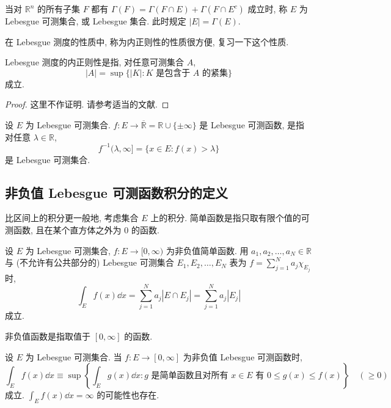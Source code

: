 \begin{definition}\label{def:2.4}
当对 $\mathbb{R}^{n}$ 的所有子集 $F$ 都有 $\Gamma(F) = \Gamma(F \cap E) + \Gamma(F \cap E^{c})$ 成立时, 称 $E$ 为 Lebesgue 可测集合, 或 Lebesgue 集合. 此时规定 $|E| = \Gamma(E)$.
\end{definition}

在 Lebesgue 测度的性质中, 称为内正则性的性质很方便, 复习一下这个性质.

\begin{theorem}\label{thm:2.1}
Lebesgue 测度的内正则性是指, 对任意可测集合 $A$,
\begin{equation}\tag{2.1}
|A| = \sup\{|K| : K \text{ 是包含于 } A \text{ 的紧集}\}
\label{eq:2.1}
\end{equation}
成立.
\end{theorem}

\begin{proof}
这里不作证明. 请参考适当的文献.
\end{proof}

\begin{definition}\label{def:2.5}
设 $E$ 为 Lebesgue 可测集合. $f: E \to \overline{\mathbb{R}} = \mathbb{R} \cup \{\pm\infty\}$ 是 Lebesgue 可测函数, 是指对任意 $\lambda \in \mathbb{R}$,
\[
f^{-1}(\lambda, \infty] = \{x \in E : f(x) > \lambda\}
\]
是 Lebesgue 可测集合.
\end{definition}

\subsection*{非负值 Lebesgue 可测函数积分的定义}

比区间上的积分更一般地, 考虑集合 $E$ 上的积分. 简单函数是指只取有限个值的可测函数, 且在某个直方体之外为 $0$ 的函数.

\begin{definition}[简单函数的积分]\label{def:2.6}
设 $E$ 为 Lebesgue 可测集合, $f: E \to [0, \infty)$ 为非负值简单函数. 用 $a_{1}, a_{2}, \ldots, a_{N} \in \mathbb{R}$ 与 (不允许有公共部分的) Lebesgue 可测集合 $E_{1}, E_{2}, \ldots, E_{N}$ 表为 $f = \sum_{j=1}^{N}a_{j}\chi_{E_{j}}$ 时,
\[
\int_{E}f(x)\dd x = \sum_{j=1}^{N}a_{j}|E \cap E_{j}| = \sum_{j=1}^{N}a_{j}|E_{j}|
\]
成立.
\end{definition}

非负值函数是指取值于 $[0, \infty]$ 的函数.

\begin{definition}[非负值函数的积分]\label{def:2.7}
设 $E$ 为 Lebesgue 可测集合. 当 $f: E \to [0, \infty]$ 为非负值 Lebesgue 可测函数时,
\[
\int_{E}f(x)\dd x \equiv \sup\left\{\int_{E}g(x)\dd x : g \text{ 是简单函数且对所有 } x \in E \text{ 有 } 0 \leq g(x) \leq f(x)\right\} \quad (\geq 0)
\]
成立. $\int_{E}f(x)\dd x = \infty$ 的可能性也存在.
\end{definition}

